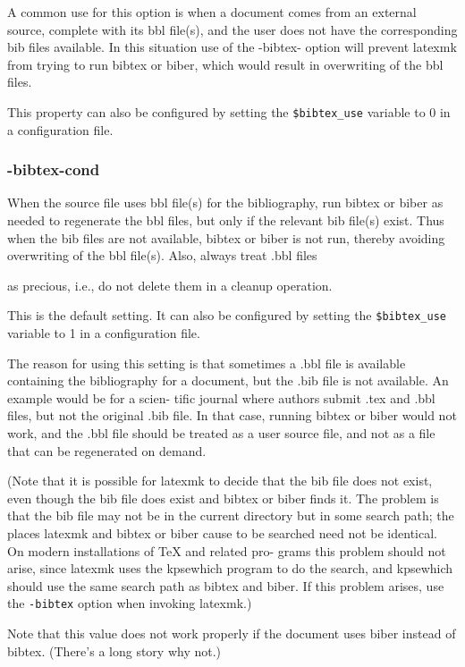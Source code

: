 A  common  use  for this option is when a document comes from an external
source, complete with its bbl  file(s),  and  the  user does  not  have  the
corresponding bib files available.  In this situation use of the -bibtex-
option will prevent  latexmk  from trying to run bibtex or biber, which would
result in overwriting of the bbl files.

This property can also be configured by setting the  \verb|$bibtex_use| variable to 0
in a configuration file.


\subsubsection{-bibtex-cond}

When  the source file uses bbl file(s) for the bibliography, run
bibtex or biber as needed to regenerate the bbl files, but  only
if  the relevant bib file(s) exist.  Thus when the bib files are
not available, bibtex or biber  is  not  run,  thereby  avoiding
overwriting  of  the bbl file(s).  Also, always treat .bbl files

as precious, i.e., do not delete them in a cleanup operation.

This is the default setting.  It can also be configured by  setting the
\verb|$bibtex_use| variable to 1 in a configuration file.

The  reason for using this setting is that sometimes a .bbl file is available
containing the bibliography for a document, but the .bib  file  is  not
available.  An example would be for a scien- tific journal where authors submit
.tex and .bbl files, but  not the  original  .bib file.  In that case, running
bibtex or biber would not work, and the .bbl file should be treated  as  a
user source  file,  and  not as a file that can be regenerated on demand.

(Note that it is possible for latexmk to  decide  that  the  bib file  does
not  exist,  even though the bib file does exist and bibtex or biber finds it.
The problem is that the bib file  may not  be  in  the  current directory but
in some search path; the places latexmk and bibtex or biber cause to be
searched need not be  identical.   On modern installations of TeX and related
pro- grams this problem should not  arise,  since  latexmk  uses  the kpsewhich
program to do the search, and kpsewhich should use the same search path as
bibtex and biber.  If this  problem  arises, use the \verb|-bibtex| option when
invoking latexmk.)

Note that this value does not work properly if the document uses biber instead
of bibtex.  (There's a long story why not.)


